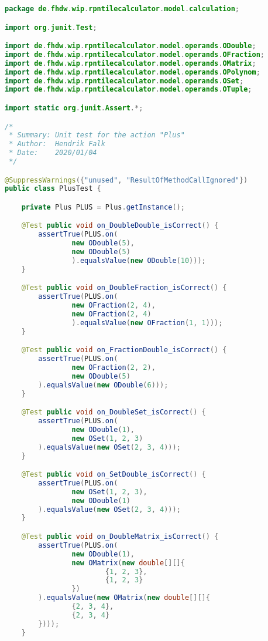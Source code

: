 \begin{lstlisting}[caption=PlusTest (Falk),label=list:PlusTest,language=Java]
package de.fhdw.wip.rpntilecalculator.model.calculation;

import org.junit.Test;

import de.fhdw.wip.rpntilecalculator.model.operands.ODouble;
import de.fhdw.wip.rpntilecalculator.model.operands.OFraction;
import de.fhdw.wip.rpntilecalculator.model.operands.OMatrix;
import de.fhdw.wip.rpntilecalculator.model.operands.OPolynom;
import de.fhdw.wip.rpntilecalculator.model.operands.OSet;
import de.fhdw.wip.rpntilecalculator.model.operands.OTuple;

import static org.junit.Assert.*;

/*
 * Summary: Unit test for the action "Plus"
 * Author:  Hendrik Falk
 * Date:    2020/01/04
 */

@SuppressWarnings({"unused", "ResultOfMethodCallIgnored"})
public class PlusTest {

    private Plus PLUS = Plus.getInstance();

    @Test public void on_DoubleDouble_isCorrect() {
        assertTrue(PLUS.on(
                new ODouble(5),
                new ODouble(5)
                ).equalsValue(new ODouble(10)));
    }

    @Test public void on_DoubleFraction_isCorrect() {
        assertTrue(PLUS.on(
                new OFraction(2, 4),
                new OFraction(2, 4)
                ).equalsValue(new OFraction(1, 1)));
    }

    @Test public void on_FractionDouble_isCorrect() {
        assertTrue(PLUS.on(
                new OFraction(2, 2),
                new ODouble(5)
        ).equalsValue(new ODouble(6)));
    }

    @Test public void on_DoubleSet_isCorrect() {
        assertTrue(PLUS.on(
                new ODouble(1),
                new OSet(1, 2, 3)
        ).equalsValue(new OSet(2, 3, 4)));
    }

    @Test public void on_SetDouble_isCorrect() {
        assertTrue(PLUS.on(
                new OSet(1, 2, 3),
                new ODouble(1)
        ).equalsValue(new OSet(2, 3, 4)));
    }

    @Test public void on_DoubleMatrix_isCorrect() {
        assertTrue(PLUS.on(
                new ODouble(1),
                new OMatrix(new double[][]{
                        {1, 2, 3},
                        {1, 2, 3}
                })
        ).equalsValue(new OMatrix(new double[][]{
                {2, 3, 4},
                {2, 3, 4}
        })));
    }


\end{lstlisting}
